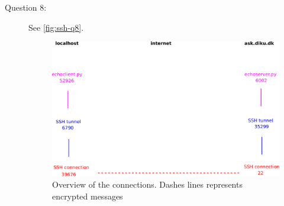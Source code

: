 \begin{description}
    \item[Question 8:]
    See \autoref{fig:ssh-q8}.
    \begin{center}
    \begin{figure}[H!]
        \includegraphics[width=0.5\paperwidth]{graphics/ssh-q8.pdf}
        \caption{\label{fig:ssh-q8}Overview of the connections. Dashes lines represents encrypted messages}
    \end{figure}
    \end{center}
\end{description}
